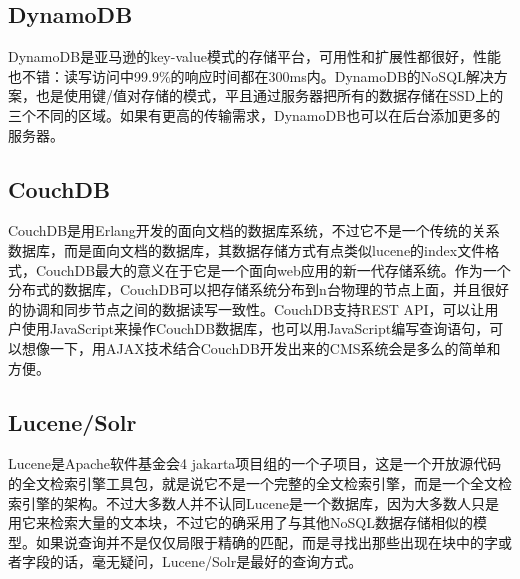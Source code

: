 \subsection{DynamoDB}
DynamoDB是亚马逊的key-value模式的存储平台，可用性和扩展性都很好，性能也不错：读写访问中99.9\%的响应时间都在300ms内。DynamoDB的NoSQL解决方案，也是使用键/值对存储的模式，平且通过服务器把所有的数据存储在SSD上的三个不同的区域。如果有更高的传输需求，DynamoDB也可以在后台添加更多的服务器。

\subsection{CouchDB}
CouchDB是用Erlang开发的面向文档的数据库系统，不过它不是一个传统的关系数据库，而是面向文档的数据库，其数据存储方式有点类似lucene的index文件格式，CouchDB最大的意义在于它是一个面向web应用的新一代存储系统。作为一个分布式的数据库，CouchDB可以把存储系统分布到n台物理的节点上面，并且很好的协调和同步节点之间的数据读写一致性。CouchDB支持REST API，可以让用户使用JavaScript来操作CouchDB数据库，也可以用JavaScript编写查询语句，可以想像一下，用AJAX技术结合CouchDB开发出来的CMS系统会是多么的简单和方便。


\subsection{Lucene/Solr}
Lucene是Apache软件基金会4 jakarta项目组的一个子项目，这是一个开放源代码的全文检索引擎工具包，就是说它不是一个完整的全文检索引擎，而是一个全文检索引擎的架构。不过大多数人并不认同Lucene是一个数据库，因为大多数人只是用它来检索大量的文本块，不过它的确采用了与其他NoSQL数据存储相似的模型。如果说查询并不是仅仅局限于精确的匹配，而是寻找出那些出现在块中的字或者字段的话，毫无疑问，Lucene/Solr是最好的查询方式。














